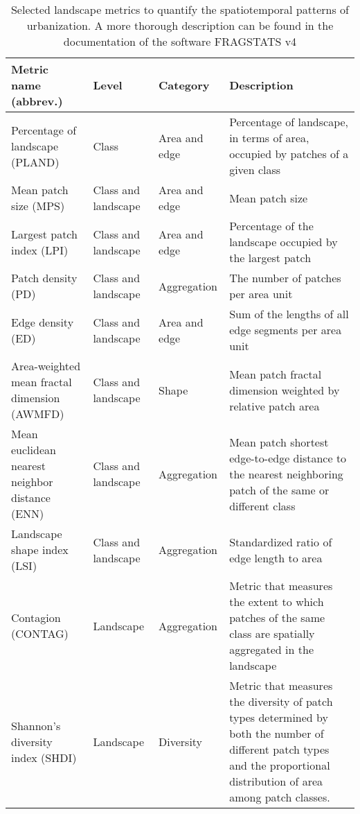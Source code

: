 \documentclass[10pt,letterpaper]{article}
\begin{document}
\begin{table}[!h]
  \begin{adjustwidth}{-.4\textwidth}{0cm} %
    \footnotesize %
    \renewcommand{\arraystretch}{1.3} %
    \centering
    \caption[Selected landscape metrics]{\label{selected-metrics}Selected landscape metrics to quantify the spatiotemporal patterns of urbanization. A more thorough description can be found in the documentation of the software FRAGSTATS v4 \cite{mcgarigal2012fragstats}}
    \begin{tabular}{p{} p{} p{} p{}} 
      \toprule
      \textbf{Metric name (abbrev.)} & \textbf{Level} & \textbf{Category} & \textbf{Description} \\
      \midrule
      Percentage of landscape (PLAND) & Class & Area and edge & Percentage of landscape, in terms of area, occupied by patches of a given class \\
      Mean patch size (MPS) & Class and landscape & Area and edge & Mean patch size \\
      Largest patch index (LPI) & Class and landscape & Area and edge & Percentage of the landscape occupied by the largest patch \\
      Patch density (PD) & Class and landscape & Aggregation & The number of patches per area unit \\
      Edge density (ED) & Class and landscape & Area and edge & Sum of the lengths of all edge segments per area unit \\
      Area-weighted mean fractal dimension (AWMFD) & Class and landscape & Shape & Mean patch fractal dimension weighted by relative patch area \\
      Mean euclidean nearest neighbor distance (ENN) & Class and landscape & Aggregation & Mean patch shortest edge-to-edge distance to the nearest neighboring patch of the same or different class \\
      Landscape shape index (LSI) & Class and landscape & Aggregation & Standardized ratio of edge length to area \\
      Contagion (CONTAG) & Landscape & Aggregation & Metric that measures the extent to which patches of the same class are spatially aggregated in the landscape \\
      Shannon's diversity index (SHDI) & Landscape & Diversity & Metric that measures the diversity of patch types determined by both the number of different patch types and the proportional distribution of area among patch classes. \\
      \bottomrule  
    \end{tabular}
  \end{adjustwidth}
\end{table}
\end{document}
